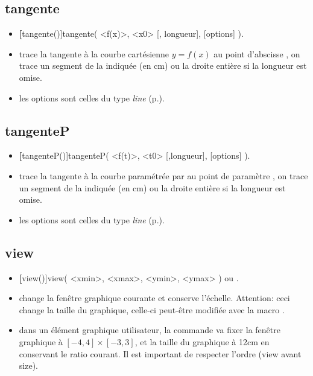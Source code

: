 \subsection{tangente}

\begin{itemize}
 \item \util \textbf[tangente()]{tangente( <f(x)>, <x0> [, longueur], [options] )}.
 \item \desc trace la tangente à la courbe cartésienne $y=f(x)$ au point d'abscisse , on trace un segment de la  indiquée (en cm) ou la droite entière si la longueur est omise.
 \item les options sont celles du type \emph{line} (p.\pageref{typeline}).
\end{itemize}


\subsection{tangenteP}

\begin{itemize}
 \item \util \textbf[tangenteP()]{tangenteP( <f(t)>, <t0> [,longueur], [options] )}.
 \item \desc trace la tangente à la courbe paramétrée par  au point de paramètre , on trace un segment de la  indiquée (en cm) ou la droite entière si la longueur est omise.
 \item les options sont celles du type \emph{line} (p.\pageref{typeline}).
\end{itemize}

\subsection{view}

\begin{itemize}
 \item \util \textbf[view()]{view( <xmin>, <xmax>, <ymin>, <ymax> )} ou .
 \item \desc change la fenêtre graphique courante et conserve l'échelle. Attention: ceci change la taille du graphique, celle-ci peut-être modifiée avec la macro .
 \item \exem dans un élément graphique utilisateur, la commande  va fixer la fenêtre graphique à $[-4,4]\times[-3,3]$, et la taille du graphique à 12cm en conservant le ratio courant. Il est important de respecter l'ordre (view avant size).
\end{itemize}


